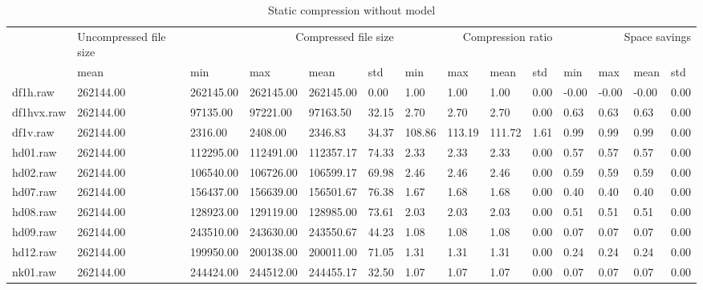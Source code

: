 \begin{table}
\caption{Static compression without model}
\begin{tabular}{llllllllllllll}
 & Uncompressed file size & \multicolumn{4}{r}{Compressed file size} & \multicolumn{4}{r}{Compression ratio} & \multicolumn{4}{r}{Space savings} \\
 & mean & min & max & mean & std & min & max & mean & std & min & max & mean & std \\
df1h.raw & 262144.00 & 262145.00 & 262145.00 & 262145.00 & 0.00 & 1.00 & 1.00 & 1.00 & 0.00 & -0.00 & -0.00 & -0.00 & 0.00 \\
df1hvx.raw & 262144.00 & 97135.00 & 97221.00 & 97163.50 & 32.15 & 2.70 & 2.70 & 2.70 & 0.00 & 0.63 & 0.63 & 0.63 & 0.00 \\
df1v.raw & 262144.00 & 2316.00 & 2408.00 & 2346.83 & 34.37 & 108.86 & 113.19 & 111.72 & 1.61 & 0.99 & 0.99 & 0.99 & 0.00 \\
hd01.raw & 262144.00 & 112295.00 & 112491.00 & 112357.17 & 74.33 & 2.33 & 2.33 & 2.33 & 0.00 & 0.57 & 0.57 & 0.57 & 0.00 \\
hd02.raw & 262144.00 & 106540.00 & 106726.00 & 106599.17 & 69.98 & 2.46 & 2.46 & 2.46 & 0.00 & 0.59 & 0.59 & 0.59 & 0.00 \\
hd07.raw & 262144.00 & 156437.00 & 156639.00 & 156501.67 & 76.38 & 1.67 & 1.68 & 1.68 & 0.00 & 0.40 & 0.40 & 0.40 & 0.00 \\
hd08.raw & 262144.00 & 128923.00 & 129119.00 & 128985.00 & 73.61 & 2.03 & 2.03 & 2.03 & 0.00 & 0.51 & 0.51 & 0.51 & 0.00 \\
hd09.raw & 262144.00 & 243510.00 & 243630.00 & 243550.67 & 44.23 & 1.08 & 1.08 & 1.08 & 0.00 & 0.07 & 0.07 & 0.07 & 0.00 \\
hd12.raw & 262144.00 & 199950.00 & 200138.00 & 200011.00 & 71.05 & 1.31 & 1.31 & 1.31 & 0.00 & 0.24 & 0.24 & 0.24 & 0.00 \\
nk01.raw & 262144.00 & 244424.00 & 244512.00 & 244455.17 & 32.50 & 1.07 & 1.07 & 1.07 & 0.00 & 0.07 & 0.07 & 0.07 & 0.00 \\
\end{tabular}
\end{table}
